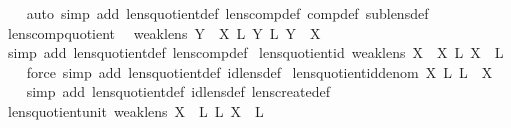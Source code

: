 \begin{isabellebody}
%
\isadelimproof
\ \ %
\endisadelimproof
%
\isatagproof
{}\isamarkupfalse%
\ {\isacharparenleft}auto\ simp\ add{\isacharcolon}\ lens{\isacharunderscore}quotient{\isacharunderscore}def\ lens{\isacharunderscore}comp{\isacharunderscore}def\ comp{\isacharunderscore}def\ sublens{\isacharunderscore}def{\isacharparenright}%
\endisatagproof
{\isafoldproof}%
%
\isadelimproof
\isanewline
%
\endisadelimproof
\isanewline
{}\isamarkupfalse%
\ lens{\isacharunderscore}comp{\isacharunderscore}quotient{\isacharcolon}\isanewline
\ \ {\isachardoublequoteopen}weak{\isacharunderscore}lens\ Y\ {\isasymLongrightarrow}\ {\isacharparenleft}X\ {\isacharsemicolon}\isactrlsub L\ Y{\isacharparenright}\ {\isacharslash}\isactrlsub L\ Y\ {\isacharequal}\ X{\isachardoublequoteclose}\isanewline
%
\isadelimproof
\ \ %
\endisadelimproof
%
\isatagproof
{}\isamarkupfalse%
\ {\isacharparenleft}simp\ add{\isacharcolon}\ lens{\isacharunderscore}quotient{\isacharunderscore}def\ lens{\isacharunderscore}comp{\isacharunderscore}def{\isacharparenright}%
\endisatagproof
{\isafoldproof}%
%
\isadelimproof
\isanewline
%
\endisadelimproof
\isanewline
{}\isamarkupfalse%
\ lens{\isacharunderscore}quotient{\isacharunderscore}id{\isacharcolon}\ {\isachardoublequoteopen}weak{\isacharunderscore}lens\ X\ {\isasymLongrightarrow}\ {\isacharparenleft}X\ {\isacharslash}\isactrlsub L\ X{\isacharparenright}\ {\isacharequal}\ {}\isactrlsub L{\isachardoublequoteclose}\isanewline
%
\isadelimproof
\ \ %
\endisadelimproof
%
\isatagproof
{}\isamarkupfalse%
\ {\isacharparenleft}force\ simp\ add{\isacharcolon}\ lens{\isacharunderscore}quotient{\isacharunderscore}def\ id{\isacharunderscore}lens{\isacharunderscore}def{\isacharparenright}%
\endisatagproof
{\isafoldproof}%
%
\isadelimproof
\isanewline
%
\endisadelimproof
\isanewline
{}\isamarkupfalse%
\ lens{\isacharunderscore}quotient{\isacharunderscore}id{\isacharunderscore}denom{\isacharcolon}\ {\isachardoublequoteopen}X\ {\isacharslash}\isactrlsub L\ {}\isactrlsub L\ {\isacharequal}\ X{\isachardoublequoteclose}\isanewline
%
\isadelimproof
\ \ %
\endisadelimproof
%
\isatagproof
{}\isamarkupfalse%
\ {\isacharparenleft}simp\ add{\isacharcolon}\ lens{\isacharunderscore}quotient{\isacharunderscore}def\ id{\isacharunderscore}lens{\isacharunderscore}def\ lens{\isacharunderscore}create{\isacharunderscore}def{\isacharparenright}%
\endisatagproof
{\isafoldproof}%
%
\isadelimproof
\isanewline
%
\endisadelimproof
\isanewline
{}\isamarkupfalse%
\ lens{\isacharunderscore}quotient{\isacharunderscore}unit{\isacharcolon}\ {\isachardoublequoteopen}weak{\isacharunderscore}lens\ X\ {\isasymLongrightarrow}\ {\isacharparenleft}{}\isactrlsub L\ {\isacharslash}\isactrlsub L\ X{\isacharparenright}\ {\isacharequal}\ {}\isactrlsub L{\isachardoublequoteclose}\isanewline

\end{isabellebody}
